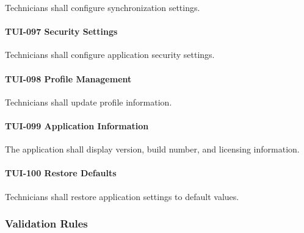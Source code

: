 Technicians shall configure synchronization settings.

\paragraph{TUI-097 Security Settings}

Technicians shall configure application security settings.

\paragraph{TUI-098 Profile Management}

Technicians shall update profile information.

\paragraph{TUI-099 Application Information}

The application shall display version, build number, and licensing
information.

\paragraph{TUI-100 Restore Defaults}

Technicians shall restore application settings to default values.


\subsubsection*{Validation Rules}

